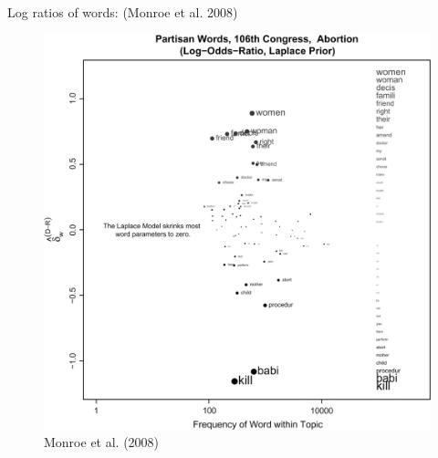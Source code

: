 \documentclass{hertieteaching}
\begin{document}
\begin{frame}{Log ratios of words: (Monroe et al. 2008)}
\protect\hypertarget{log-ratios-of-words-keyness}{}

\begin{figure}

{\centering \includegraphics[width=0.6\linewidth]{pictures/fightin1} 

}

\caption{Monroe et al. (2008)}\label{fig:unnamed-chunk-10}
\end{figure}

\end{frame}

%
%
%
%
%
\end{document}
